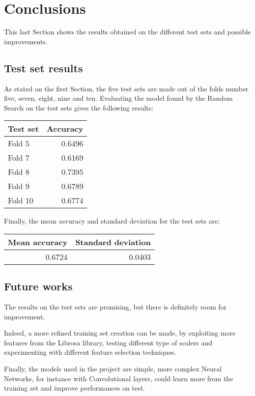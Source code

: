 \section{Conclusions}
\label{results}

This last Section shows the results obtained on the different 
test sets and possible improvements.

\subsection{Test set results}
As stated on the first Section, the five test sets are made out of the 
folds number five, seven, eight, nine and ten.
Evaluating the model found by the Random Search on the test sets 
gives the following results: 

\begin{center}
    \begin{tabular}{ |l|r| } 
        \hline
        Test set & Accuracy\\
        \hline
        Fold 5 & 0.6496 \\
        Fold 7 & 0.6169 \\
        Fold 8 & 0.7395 \\
        Fold 9 & 0.6789 \\
        Fold 10 & 0.6774 \\ 
        \hline
    \end{tabular}
\end{center}

Finally, the mean accuracy and standard deviation for the test sets are: 
\begin{center}
    \begin{tabular}{ |r|r| } 
        \hline
        Mean accuracy & Standard deviation\\
        \hline
        0.6724 & 0.0403 \\
        \hline
    \end{tabular}
\end{center}

\subsection{Future works}

The results on the test sets are promising, but there is definitely 
room for improvement.

Indeed, a more refined training set creation can be made, by exploiting 
more features from the Librosa library, testing different type 
of scalers and experimenting with different feature selection 
techniques.

Finally, the models used in the project are simple, more complex 
Neural Networks, for instance with Convolutional layers, could learn 
more from the training set and improve performances on test.